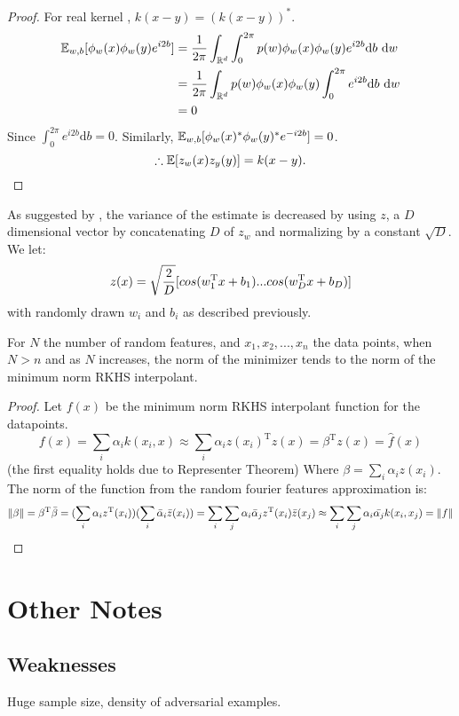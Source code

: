 \documentclass[twoside]{memoir}
\begin{document}
\begin{proof}
	For real kernel , $k(x - y) = (k(x - y))^*$.
	\begin{equation*}
	\begin{split}
	\mathbb{E}_{w,b}[\phi_w(x)\phi_w(y)e^{i2b}] &= \frac{1}{2\pi}\int_{\mathbb{R}^d}\int_{0}^{2\pi} p(w)\phi_w(x)\phi_w(y)e^{i2b} \text{d}b~\text{d}w \\
	&= \frac{1}{2\pi}\int_{\mathbb{R}^d} p(w)\phi_w(x)\phi_w(y) \int_{0}^{2\pi} e^{i2b} \text{d}b~\text{d}w \\
	&= 0
	\end{split}
	\end{equation*}
	Since $\int_{0}^{2\pi} e^{i2b} \text{d}b = 0$. Similarly, $	\mathbb{E}_{w,b}[\phi_w(x)^*\phi_w(y)^*e^{-i2b}] = 0$.
	\[ \therefore \mathbb{E}[z_w(x)z_y(y)] = k(x - y). \]
	
\end{proof}
As suggested by \cite{RFF_Rahimi}, the variance of the estimate is decreased by using $z$, a $D$ dimensional vector by concatenating $D$ of $z_w$ and normalizing by a constant $\sqrt{D}$. We let:
\[z(x) = \sqrt{\frac{2}{D}} [cos(w_1^{\text{T}}x + b_1) ... cos(w_D^{\text{T}}x + b_D)] \]
with randomly drawn $w_i$ and $b_i$ as described previously.


\begin{thm} \label{thm:RFFnorm}
	For $N$ the number of random features, and $x_1, x_2, ..., x_n$ the data points, when $N > n$ and as $N$ increases, the norm of the minimizer tends to  the norm of the minimum norm RKHS interpolant.
\end{thm}
\begin{proof}
	Let $f(x)$ be the minimum norm RKHS interpolant function for the datapoints. 
	\[f(x) = \sum_{i}\alpha_ik(x_i, x) \approx \sum_{i}\alpha_iz(x_i)^\text{T}z(x) 
	= \beta^\text{T}z(x) = \hat{f}(x)
	\] (the first equality holds due to Representer Theorem)
	Where $\beta = \sum_{i}\alpha_iz(x_i) $.
	The norm of the function from the random fourier features approximation is:
	\[ \lVert\beta\rVert =   \beta^\text{T} \bar{\beta} = 
	(\sum_{i}\alpha_i z^\text{T}(x_i)) (\sum_{i}\bar{\alpha}_i\bar{z}(x_i)) 
	= \sum_i \sum_j \alpha_i \bar{\alpha}_j z^\text{T}(x_i)\bar{z}(x_j)  
	\approx \sum_i \sum_j \alpha_i \bar{ \alpha_j} k(x_i, x_j)
	= \lVert f\rVert
	\]
\end{proof}

\chapter{Other Notes}
\section{Weaknesses}
Huge sample size, density of adversarial examples.
\end{document}
